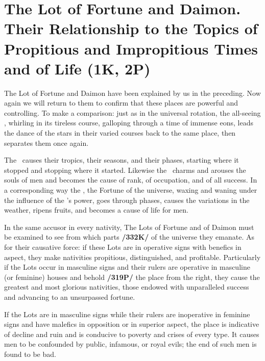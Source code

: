 \section{The Lot of Fortune and Daimon. Their Relationship to the Topics of Propitious and Impropitious Times and of Life (1K, 2P)}

 
The Lot of Fortune and Daimon have been explained by us in the preceding. Now again we will return to them to confirm that these places are powerful and controlling. To make a comparison: just as in
the universal rotation, the all-seeing \Sun, whirling in its tireless course, galloping through a time of immense eons, leads the dance of the stars in their varied courses back to the same place, then separates them once again. 

 
The \Sun\, causes their tropics, their seasons, and their phases, starting where it stopped and stopping where it started. Likewise the \Sun\, charms and arouses the souls of men and becomes the cause of rank, of occupation, and of all success. In a corresponding way the \Moon, the Fortune of the universe, waxing and waning under the influence of the \Sun’s power, goes through phases, causes the variations in the weather, ripens fruits, and becomes a cause of life for men. 

 
In the same accusor in every nativity, The Lots of Fortune and of Daimon must be examined to see from which parts \textbf{/332K/} of the universe they emanate. As for their causative force: if these Lots are in operative signs with benefics in aspect, they make nativities propitious, distinguished, and profitable. Particularly if the Lots occur in
masculine signs and their rulers are operative in masculine (or feminine) houses and behold \textbf{/319P/} the place from the right, they cause the greatest and most glorious nativities, those endowed with unparalleled success and advancing to an unsurpassed fortune. 

If the Lots are in masculine signs while their rulers are inoperative in feminine signs and have malefics in opposition or in superior aspect, the place is indicative of decline and ruin and is conducive to poverty and crises of every type. It causes men to be confounded by public, infamous, or royal evils; the end of such men is found to be bad.

